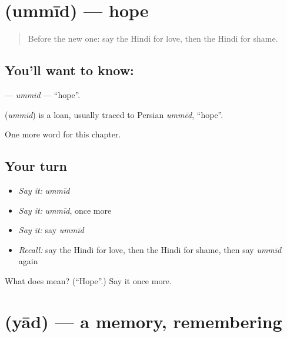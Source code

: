 \section[\texorpdfstring{\hi{उम्मीद} (ummīd)}{उम्मीद (ummīd)}]{ (ummīd) — hope}

\label{lesson:HI-C186-ummid}



\begin{quote}
Before the new one: say the Hindi for love, then the Hindi for shame.
\end{quote}

\subsection*{You'll want to know: }
\textbf{} — \emph{ummīd} — \textquotedblleft{}hope\textquotedblright{}.

\begin{cousinweb}
\textbf{} (\emph{ummīd}) is a loan, usually traced to Persian \emph{ummēd}, \textquotedblleft{}hope\textquotedblright{}.
\end{cousinweb}

\begin{grammarlens}[title={What you've built}]
One more word for this chapter.
\end{grammarlens}

\subsection*{Your turn}
\begin{itemize}
\raggedright
  \item \emph{Say it:} \emph{ummīd}
  \item \emph{Say it:} \emph{ummīd}, once more
  \item \emph{Say it:} say \emph{ummīd}
  \item \emph{Recall:} say the Hindi for love, then the Hindi for shame, then say \emph{ummīd} again
\end{itemize}

\begin{tcolorbox}[breakable,colback=teal!4,colframe=teal!35!black,title={Before you move on}]
What does  mean? (\textquotedblleft{}Hope\textquotedblright{}.) Say it once more.
\end{tcolorbox}
\section[\texorpdfstring{\hi{याद} (yād)}{याद (yād)}]{ (yād) — a memory, remembering}

